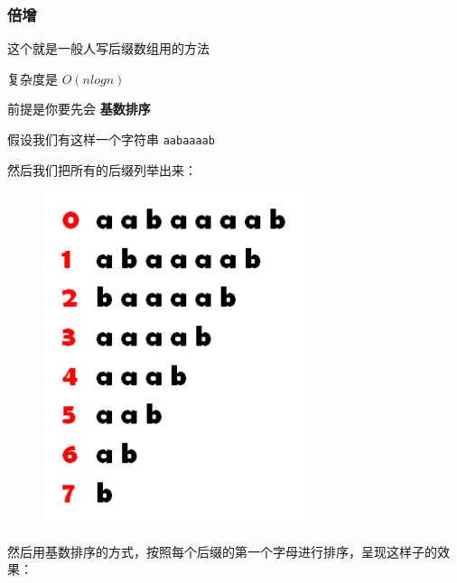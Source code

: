 \subsubsection{倍增}

这个就是一般人写后缀数组用的方法

复杂度是 $O(nlogn)$ 

前提是你要先会 \textbf{ 基数排序 }

假设我们有这样一个字符串 \texttt{aabaaaab}

然后我们把所有的后缀列举出来：

\begin{figure}[htbp]
\centering
\includegraphics[width=0.7\textwidth]{docs/string/images/sa1.png} 

\end{figure}

然后用基数排序的方式，按照每个后缀的第一个字母进行排序，呈现这样子的效果：

